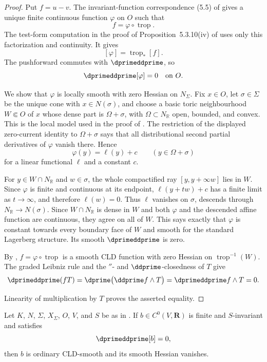 \begin{proof}
Put $f=u-v$.  The invariant-function correspondence (5.5) of
\cite{BGJKK25} gives a unique finite continuous function $\varphi$ on
$O$ such that
\[
                            f=\varphi\circ\operatorname{trop}.
\]
The test-form computation in the proof of Proposition~5.3.10(iv) of
\cite{BGJKK25} uses only this factorization and continuity.  It gives
\[
                         [\varphi]=\operatorname{trop}_*[f].
\]
The pushforward commutes with $\dprimeddprime$, so
\[
 \dprimeddprime[\varphi]=0\quad\hbox{on }O.
\]

We show that $\varphi$ is locally smooth with zero Hessian on
$N_\Sigma$.  Fix $x\in O$, let $\sigma\in\Sigma$ be the unique cone with
$x\in N(\sigma)$, and choose a basic toric neighbourhood $W\Subset O$ of
$x$ whose dense part is $\Omega+\sigma$, with
$\Omega\subset N_{\mathbb R}$ open, bounded, and convex.  This is the
local model used in the proof of \cite[Theorem~3.1.4]{BGJKK25}.  The
restriction of the displayed zero-current identity to $\Omega+\sigma$
says that all distributional second partial derivatives of $\varphi$
vanish there.  Hence
\[
 \varphi(y)=\ell(y)+c\qquad(y\in\Omega+\sigma)
\]
for a linear functional $\ell$ and a constant $c$.

For $y\in W\cap N_{\mathbb R}$ and $w\in\sigma$, the whole compactified
ray $[y,y+\infty w]$ lies in $W$.  Since $\varphi$ is finite and continuous
at its endpoint, $\ell(y+tw)+c$ has a finite limit as $t\to\infty$, and
therefore $\ell(w)=0$.  Thus $\ell$ vanishes on $\sigma$, descends
through $N_{\mathbb R}\to N(\sigma)$.  Since $W\cap N_{\mathbb R}$ is dense
in $W$ and both $\varphi$ and the descended affine function are continuous,
they agree on all of $W$.  This says exactly that $\varphi$
is constant towards every boundary face of $W$ and smooth for the standard
Lagerberg structure.  Its smooth $\dprimeddprime$ is zero.

By \cite[Proposition~2.3.4]{BGJKK25},
$f=\varphi\circ\operatorname{trop}$ is a smooth CLD function with zero
Hessian on $\operatorname{trop}^{-1}(W)$.  The graded Leibniz rule and the
$\dprime$- and $\ddprime$-closedness of $T$ give
\[
 \dprimeddprime(fT)
 =\dprime\bigl(\ddprime f\wedge T\bigr)
 =\dprimeddprime f\wedge T
 =0.
\]

Linearity of multiplication by $T$ proves the asserted equality.
\end{proof}

\begin{corollary}
\label{cor:p213-invariant-split-toric-zero-current-smooth}
Let $K$, $N$, $\Sigma$, $X_\Sigma$, $O$, $V$, and $S$ be as
in .  If
$b\in C^0(V,\mathbf R)$ is finite and $S$-invariant and satisfies
\[
                         \dprimeddprime[b]=0,
\]
then $b$ is ordinary CLD-smooth and its smooth Hessian vanishes.
\end{corollary}


